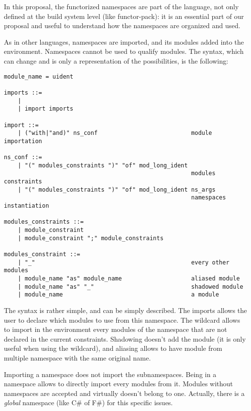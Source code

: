 \documentclass[11pt,a4paper]{article}
\begin{document}
In this proposal, the functorized namespaces are part of the language, not only
defined at the build system level (like functor-pack): it is an essential part
of our proposal and useful to understand how the namespaces are organized and
used.

\medskip

As in other languages, namespaces are imported, and its modules added into the
environment. Namespaces cannot be used to qualify modules. The syntax, which can
change and is only a representation of the possibilities, is the following:

\begin{verbatim}
module_name = uident

imports ::=
    | 
    | import imports 

import ::=
    | ("with|"and)" ns_conf                           module importation    

ns_conf ::=
    | "(" modules_constraints ")" "of" mod_long_ident 
                                                      modules constraints
    | "(" modules_constraints ")" "of" mod_long_ident ns_args 
                                                      namespaces instantiation 

modules_constraints ::=
    | module_constraint
    | module_constraint ";" module_constraints

modules_constraint ::=
    | "_"                                             every other modules
    | module_name "as" module_name                    aliased module
    | module_name "as" "_"                            shadowed module
    | module_name                                     a module
\end{verbatim}

The syntax is rather simple, and can be simply described. The imports allows the
user to declare which modules to use from this namespace. The wildcard allows to
import in the environment every modules of the namespace that are not declared
in the current constraints. Shadowing doesn't add the module (it is only useful
when using the wildcard), and aliasing allows to have module from multiple
namespace with the same original name.

Importing a namespace does not import the subnamespaces. Being in a namespace
allows to directly import every modules from it. Modules without namespaces are
accepted and virtually doesn't belong to one. Actually, there is a \emph{global}
namespace (like C\# of F\#) for this specific issues.
\end{document}
